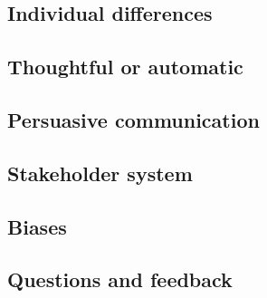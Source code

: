 \documentclass[../summary.tex]{subfiles}
\begin{document}
		\subsection{Individual differences}
		
		\subsection{Thoughtful or automatic}
		
		\subsection{Persuasive communication}
		
		\subsection{Stakeholder system}
		
		\subsection{Biases}
		
		\subsection{Questions and feedback}
\end{document}
